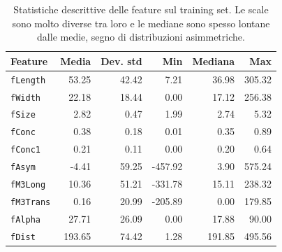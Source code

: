 \begin{table}[H]\centering\small
\caption{Statistiche descrittive delle feature sul training set. Le scale sono molto diverse tra loro e le mediane sono spesso lontane dalle medie, segno di distribuzioni asimmetriche.}\label{tab:describe}
\begin{tabular}{lrrrrr}
\toprule
\textbf{Feature} & \textbf{Media} & \textbf{Dev. std} & \textbf{Min} & \textbf{Mediana} & \textbf{Max} \\
\midrule
\texttt{fLength} & 53.25 & 42.42 & 7.21 & 36.98 & 305.32 \\
\texttt{fWidth} & 22.18 & 18.44 & 0.00 & 17.12 & 256.38 \\
\texttt{fSize} & 2.82 & 0.47 & 1.99 & 2.74 & 5.32 \\
\texttt{fConc} & 0.38 & 0.18 & 0.01 & 0.35 & 0.89 \\
\texttt{fConc1} & 0.21 & 0.11 & 0.00 & 0.20 & 0.64 \\
\texttt{fAsym} & -4.41 & 59.25 & -457.92 & 3.90 & 575.24 \\
\texttt{fM3Long} & 10.36 & 51.21 & -331.78 & 15.11 & 238.32 \\
\texttt{fM3Trans} & 0.16 & 20.99 & -205.89 & 0.00 & 179.85 \\
\texttt{fAlpha} & 27.71 & 26.09 & 0.00 & 17.88 & 90.00 \\
\texttt{fDist} & 193.65 & 74.42 & 1.28 & 191.85 & 495.56 \\
\bottomrule
\end{tabular}
\end{table}
